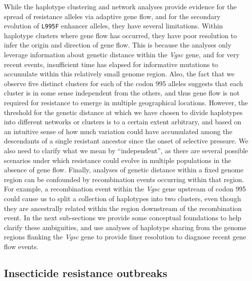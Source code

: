 \documentclass[a4paper,11pt,abstracton]{scrartcl}
\begin{document}
%
While the haplotype clustering and network analyses provide evidence for the spread of resistance alleles via adaptive gene flow, and for the secondary evolution of \texttt{L995F} enhancer alleles, they have several limitations.
%
Within haplotype clusters where gene flow has occurred, they have poor resolution to infer the origin and direction of gene flow.
%
This is because the analyses only leverage information about genetic distance within the \textit{Vgsc} gene, and for very recent events, insufficient time has elapsed for informative mutations to accumulate within this relatively small genome region.
%
Also, the fact that we observe five distinct clusters for each of the codon 995 alleles suggests that each cluster is in some sense independent from the others, and thus gene flow is not required for resistance to emerge in multiple geographical locations.
%
However, the threshold for the genetic distance at which we have chosen to divide haplotypes into different networks or clusters is to a certain extent arbitrary, and based on an intuitive sense of how much variation could have accumulated among the descendants of a single resistant ancestor since the onset of selective pressure.
%
We also need to clarify what we mean by ``independent'', as there are several possible scenarios under which resistance could evolve in multiple populations in the absence of gene flow.
%
Finally, analyses of genetic distance within a fixed genome region can be confounded by recombination events occurring within that region.
%
For example, a recombination event within the \textit{Vgsc} gene upstream of codon 995 could cause us to split a collection of haplotypes into two clusters, even though they are ancestrally related within the region downstream of the recombination event.
%
In the next sub-sections we provide some conceptual foundations to help clarify these ambiguities, and use analyses of haplotype sharing from the genome regions flanking the \textit{Vgsc} gene to provide finer resolution to diagnose recent gene flow events.


\subsection*{Insecticide resistance outbreaks}
\end{document}
